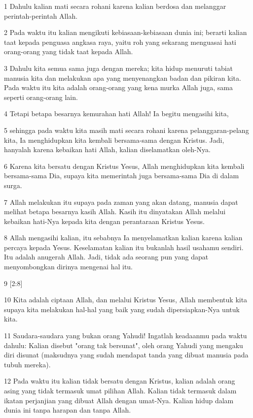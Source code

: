 \par 1 Dahulu kalian mati secara rohani karena kalian berdosa dan melanggar perintah-perintah Allah.
\par 2 Pada waktu itu kalian mengikuti kebiasaan-kebiasaan dunia ini; berarti kalian taat kepada penguasa angkasa raya, yaitu roh yang sekarang menguasai hati orang-orang yang tidak taat kepada Allah.
\par 3 Dahulu kita semua sama juga dengan mereka; kita hidup menuruti tabiat manusia kita dan melakukan apa yang menyenangkan badan dan pikiran kita. Pada waktu itu kita adalah orang-orang yang kena murka Allah juga, sama seperti orang-orang lain.
\par 4 Tetapi betapa besarnya kemurahan hati Allah! Ia begitu mengasihi kita,
\par 5 sehingga pada waktu kita masih mati secara rohani karena pelanggaran-pelang kita, Ia menghidupkan kita kembali bersama-sama dengan Kristus. Jadi, hanyalah karena kebaikan hati Allah, kalian diselamatkan oleh-Nya.
\par 6 Karena kita bersatu dengan Kristus Yesus, Allah menghidupkan kita kembali bersama-sama Dia, supaya kita memerintah juga bersama-sama Dia di dalam surga.
\par 7 Allah melakukan itu supaya pada zaman yang akan datang, manusia dapat melihat betapa besarnya kasih Allah. Kasih itu dinyatakan Allah melalui kebaikan hati-Nya kepada kita dengan perantaraan Kristus Yesus.
\par 8 Allah mengasihi kalian, itu sebabnya Ia menyelamatkan kalian karena kalian percaya kepada Yesus. Keselamatan kalian itu bukanlah hasil usahamu sendiri. Itu adalah anugerah Allah. Jadi, tidak ada seorang pun yang dapat menyombongkan dirinya mengenai hal itu.
\par 9 [2:8]
\par 10 Kita adalah ciptaan Allah, dan melalui Kristus Yesus, Allah membentuk kita supaya kita melakukan hal-hal yang baik yang sudah dipersiapkan-Nya untuk kita.
\par 11 Saudara-saudara yang bukan orang Yahudi! Ingatlah keadaanmu pada waktu dahulu: Kalian disebut "orang tak bersunat", oleh orang Yahudi yang mengaku diri disunat (maksudnya yang sudah mendapat tanda yang dibuat manusia pada tubuh mereka).
\par 12 Pada waktu itu kalian tidak bersatu dengan Kristus, kalian adalah orang asing yang tidak termasuk umat pilihan Allah. Kalian tidak termasuk dalam ikatan perjanjian yang dibuat Allah dengan umat-Nya. Kalian hidup dalam dunia ini tanpa harapan dan tanpa Allah.
